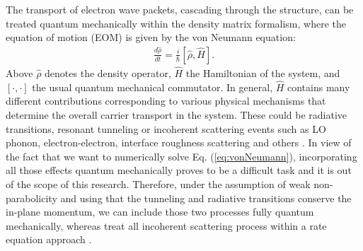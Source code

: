 \documentclass[10pt,letterpaper]{article}
\begin{document}
The transport of electron wave packets, cascading through the structure, can be treated quantum mechanically within the density matrix formalism, where the equation of motion (EOM) is given by the von Neumann equation:
\begin{align}
\label{eq:vonNeumann}
\frac{d \hat{\rho}}{dt} =\frac{i}{\hbar}[\hat{\rho},\hat{H}].
\end{align}
Above $\hat{\rho}$ denotes the density operator, $\hat{H}$ the Hamiltonian of the system, and $[\cdot,\cdot]$ the usual quantum mechanical commutator. In general, $\hat{H}$ contains many different contributions corresponding to various physical mechanisms that determine the overall carrier transport in the system. These could be radiative transitions, resonant tunneling or incoherent scattering events such as LO phonon, electron-electron, interface roughness scattering and others \cite{jirauschek2014modeling}. In view of the fact that we want to numerically solve Eq. (\ref{eq:vonNeumann}), incorporating all those effects quantum mechanically proves to be a difficult task and it is out of the scope of this research. Therefore, under the assumption of weak non-parabolicity and using that the tunneling and radiative transitions conserve the in-plane momentum, we can include those two processes fully quantum mechanically, whereas treat all incoherent scattering process within a rate equation approach \cite{jirauschek2014modeling,iotti2005microscopic}. 
\end{document}
